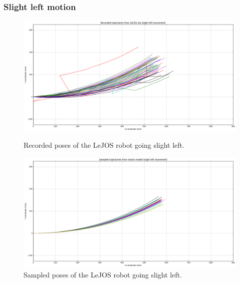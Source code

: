\documentclass[paper=a4, fontsize=11pt]{scrartcl} %
\begin{document}
    \subsubsection*{Slight left motion}
    \begin{figure}[H]
    \centering
    \begin{minipage}{\textwidth}
        \centering
        \includegraphics[width=\textwidth]{images/recorded_poses_slight_left.png} %
        \caption{Recorded poses of the LeJOS robot going slight left.}
    \end{minipage}\hfill
    \begin{minipage}{\textwidth}
        \centering
        \includegraphics[width=1\textwidth]{images/sampled_poses_slightLeft.png} %
        \caption{Sampled poses of the LeJOS robot going slight left.}
    \end{minipage}
    \end{figure}
\end{document}

